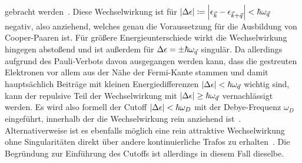 gebracht werden~\cite{czycholl_theoretische_2017}. 
Diese Wechselwirkung ist für $\abs{\Delta \epsilon} \coloneqq \abs{\epsilon_{\vec{k}} - \epsilon_{{\vec{k}} + {\vec{q}}}} < \hbar \omega_{\vec{q}}$ negativ, also anziehend, welches genau die Voraussetzung für die Ausbildung von Cooper-Paaren ist.
Für größere Energieunterschiede wirkt die Wechselwirkung hingegen abstoßend und ist außerdem für $\Delta \epsilon = \pm \hbar \omega_{\vec{q}}$ singulär. 
Da allerdings aufgrund des Pauli-Verbots davon ausgegangen werden kann, dass die gestreuten Elektronen vor allem aus der Nähe der Fermi-Kante stammen und damit hauptsächlich Beiträge mit kleinen Energiedifferenzen $\abs{\Delta \epsilon} < \hbar \omega_{\vec{q}}$ wichtig sind, kann der repulsive Teil der Wechselwirkung mit $\abs{\Delta \epsilon} \geq \hbar \omega_{\vec{q}}$ vernachlässigt werden.
Es wird also formell der Cutoff $\abs{\Delta \epsilon} < \hbar \omega_D$ mit der Debye-Frequenz $\omega_D$ eingeführt, innerhalb der die Wechselwirkung rein anziehend ist~\cite{czycholl_theoretische_2017}.
Alternativerweise ist es ebenfalls möglich eine rein attraktive Wechselwirkung ohne Singularitäten direkt über andere kontinuierliche Trafos zu erhalten~\cite{krull_enhanced_2012}. 
Die Begründung zur Einführung des Cutoffs ist allerdings in diesem Fall dieselbe.




